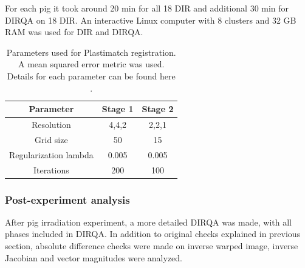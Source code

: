 \documentclass[type=dr, dr=rernat, accentcolor=tud7b,colorbacktitle, bigchapter, openright, twoside, 12pt ]{tudthesis}
\begin{document}
For each pig it took around 20 min for all 18 DIR and additional 30 min for DIRQA on 18 DIR. An interactive Linux computer with 8 clusters and 32 GB RAM was used for DIR and DIRQA.

\begin{table}[H]
  \centering
  \caption{Parameters used for Plastimatch registration.  A mean squared error metric was used. Details for each parameter can be found here \cite{Plastimatch}.}
  \begin{tabular}{c|c|c}
      Parameter & Stage 1 & Stage 2 \\
      \hline
      Resolution & 4,4,2 & 2,2,1 \\
      Grid size & 50 & 15 \\
      Regularization lambda & 0.005 & 0.005 \\
      Iterations & 200 & 100 \\
    \hline\hline
  \end{tabular}
  \label{tab:stages2}
\end{table}

\subsubsection{Post-experiment analysis}

After pig irradiation experiment, a more detailed DIRQA was made, with all phases included in DIRQA. In addition to original checks explained in previous section, absolute difference checks were made on inverse warped image, 
inverse Jacobian and vector magnitudes were analyzed.
\end{document}
